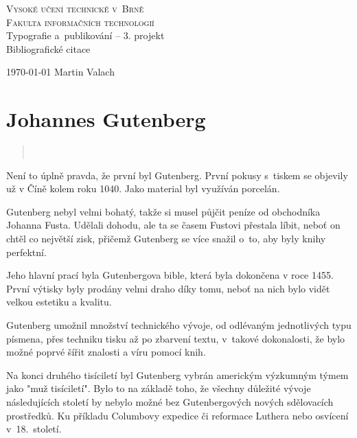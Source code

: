 \documentclass[a4paper, 11pt]{article}
\begin{document}
    \begin{titlepage}
		\begin{center}
			{\Huge\textsc{
			    Vysoké učení technické v~Brně
			    \\[0.2em]
			}
			\huge\textsc{
			    Fakulta informačních technologií
			}
			}
			{\LARGE
				\\ Typografie a~publikování -- 3. projekt \\[0.3em]
				\Huge Bibliografické citace
			}
		\end{center}

		{\Large
			\today
			\hfill Martin Valach
		}
	\end{titlepage}


	\section*{Johannes Gutenberg}
	
	\begin{quote}
	\textit{} ~\cite{wiki}
	\end{quote}

	Není to úplně pravda, že první byl Gutenberg. První pokusy s~tiskem se objevily už v Číně kolem roku 1040. Jako material byl využíván porcelán. ~\cite{LuciaKianicova}

	Gutenberg nebyl velmi bohatý, takže si musel půjčit peníze od obchodníka Johanna Fusta. Udělali dohodu, ale ta se časem Fustovi přestala líbit, neboť on chtěl co největší zisk, přičemž Gutenberg se více snažil o~to, aby byly knihy perfektní. ~\cite{britannica}

	Jeho hlavní prací byla Gutenbergova bible, která byla dokončena v roce 1455. První výtisky byly prodány velmi draho díky tomu, neboť na nich bylo vidět velkou estetiku a kvalitu. ~\cite{asme}
	
	Gutenberg umožnil množství technického vývoje, od odlévaným jednotlivých typu písmena, přes techniku tisku až po zbarvení textu, v~takové dokonalosti, že bylo možné poprvé šířit znalosti a víru pomocí knih. ~\cite{StephanFussel}

	Na konci druhého tisíciletí byl Gutenberg vybrán americkým výzkumným týmem jako "muž tisíciletí". Bylo to na základě toho, že všechny důležité vývoje následujících století by nebylo možné bez Gutenbergových nových sdělovacích prostředků. Ku příkladu Columbovy expedice či reformace Luthera nebo osvícení v~18.~století. ~\cite{ManOfTheMillennium}
\end{document}
